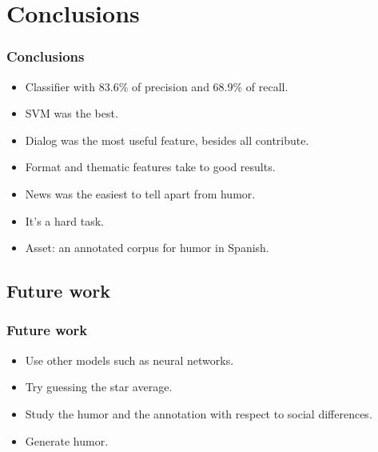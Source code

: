\section{Conclusions}

\begin{frame}
    \frametitle{Conclusions}

    \begin{itemize}
        \item[\checkmark] Classifier with 83.6\% of precision and 68.9\% of recall.
        \item[\checkmark] SVM was the best.
        \item[\checkmark] Dialog was the most useful feature, besides all contribute.
        \item[\checkmark] Format and thematic features take to good results.
        \item[\checkmark] News was the easiest to tell apart from humor.
        \item[\checkmark] It's a hard task.
        \item[\checkmark] Asset: an annotated corpus for humor in Spanish.
    \end{itemize}
\end{frame}

\subsection{Future work}
\begin{frame}
    \frametitle{Future work}

    \begin{itemize}
        \item Use other models such as neural networks.
        \item Try guessing the star average.
        \item Study the humor and the annotation with respect to social differences.
        \item Generate humor.
    \end{itemize}
\end{frame}
